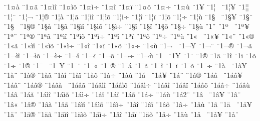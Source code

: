 {^^a81^^a4^^e0
^^a81^^a4^^e3
^^a81^^a4^^ec^^ee
^^a81^^a4^^ec^^f5
^^a81^^a4^^ec^^f7
^^a81^^a4^^ee
^^a81^^a4^^ef
^^a81^^a4^^f5
^^a81^^a4^^f7
^^a81^^a4^^f9
^^a81^^a5
^^a81^^a6^^a0
^^a81^^a6^^a5
^^a81^^a6^^a6
^^a81^^a6^^a8
^^a81^^a6^^ac
^^a81^^a6^^ae
^^a81^^a6^^e0
^^a81^^a6^^e3
^^a81^^a6^^ec^^ee
^^a81^^a6^^ec^^f5
^^a81^^a6^^ec^^f7
^^a81^^a6^^ee
^^a81^^a6^^ef
^^a81^^a6^^f5
^^a81^^a6^^f7
^^a81^^a6^^f9
^^a81^^a7^^a0
^^a81^^a7^^a5
^^a81^^a7^^a8
^^a81^^a7^^ad^^a0
^^a81^^a7^^ae
^^a81^^a7^^e0
^^a81^^a7^^e3
^^a81^^a7^^ec^^ee
^^a81^^a7^^ec^^f5
^^a81^^a7^^ec^^f7
^^a81^^a7^^ee
^^a81^^a7^^ef
^^a81^^a7^^f5
^^a81^^a7^^f7
^^a81^^a7^^f9
^^a81^^a8
^^a81^^aa^^a0
^^a81^^aa^^a5
^^a81^^aa^^a8
^^a81^^aa^^ae
^^a81^^aa^^e3
^^a81^^aa^^ec^^ee
^^a81^^aa^^ec^^f5
^^a81^^aa^^ec^^f7
^^a81^^aa^^ee
^^a81^^aa^^ef
^^a81^^aa^^f5
^^a81^^aa^^f7
^^a81^^aa^^f9
^^a81^^ab^^a0
^^a81^^ab^^a5
^^a81^^ab^^a8
^^a81^^ab^^ae
^^a81^^ab^^e3
^^a81^^ab^^ec^^ee
^^a81^^ab^^ec^^f5
^^a81^^ab^^ec^^f7
^^a81^^ab^^ee
^^a81^^ab^^ef
^^a81^^ab^^f5
^^a81^^ab^^f7
^^a81^^ab^^f9
^^a81^^ac^^a0
^^a81^^ac^^a5
^^a81^^ac^^a8
^^a81^^ac^^ae
^^a81^^ac^^e3
^^a81^^ac^^ec^^ee
^^a81^^ac^^ec^^f5
^^a81^^ac^^ec^^f7
^^a81^^ac^^ee
^^a81^^ac^^ef
^^a81^^ac^^f5
^^a81^^ac^^f7
^^a81^^ac^^f9
^^a81^^ad^^a0
^^a81^^ad^^a5
^^a81^^ad^^a8
^^a81^^ad^^ae
^^a81^^ad^^e3
^^a81^^ad^^ee
^^a81^^ad^^ef
^^a81^^ad^^f5
^^a81^^ad^^f7
^^a81^^ae
^^a81^^af^^a0
^^a81^^af^^a5
^^a81^^af^^a8
^^a81^^af^^ab
^^a81^^af^^ae
^^a81^^af^^e1
^^a81^^af^^e3
^^a81^^af^^ee
^^a81^^af^^ef
^^a81^^af^^f5
^^a81^^af^^f7
^^a81^^e0^^a0
^^a81^^e0^^a5
^^a81^^e0^^a8
^^a81^^e0^^ae
^^a81^^e0^^e3
^^a81^^e0^^ee
^^a81^^e0^^ef
^^a81^^e0^^f5
^^a81^^e0^^f7
^^a81^^e0^^f9
^^a81^^e1^^a0
^^a81^^e1^^a5
^^a81^^e1^^a8
^^a81^^e1^^ae
^^a81^^e1^^e2^^a0
^^a81^^e1^^e2^^a5
^^a81^^e1^^e2^^a8
^^a81^^e1^^e2^^ae
^^a81^^e1^^e2^^e0^^a0
^^a81^^e1^^e2^^e3
^^a81^^e1^^e2^^ec^^ee
^^a81^^e1^^e2^^ec^^f5
^^a81^^e1^^e2^^ec^^f7
^^a81^^e1^^e2^^ee
^^a81^^e1^^e2^^ef
^^a81^^e1^^e2^^f5
^^a81^^e1^^e2^^f7
^^a81^^e1^^e2^^f9
^^a81^^e1^^e2
^^a81^^e1^^e3
^^a81^^e1^^ec^^ee
^^a81^^e1^^ec^^f5
^^a81^^e1^^ec^^f7
^^a81^^e1^^ee
^^a81^^e1^^ef
^^a81^^e1^^f5
^^a81^^e1^^f7
^^a81^^e1^^f9
^^a81^^e12^^ad^^a8
^^a81^^e2^^a0
^^a81^^e2^^a5
^^a81^^e2^^a8
^^a81^^e2^^ab
^^a81^^e2^^ae
^^a81^^e2^^e0
^^a81^^e2^^e3
^^a81^^e2^^ec^^ee
^^a81^^e2^^ec^^f5
^^a81^^e2^^ec^^f7
^^a81^^e2^^ee
^^a81^^e2^^ef
^^a81^^e2^^f5
^^a81^^e2^^f7
^^a81^^e2^^f9
^^a81^^e3
^^a81^^e4^^a0
^^a81^^e4^^a5
^^a81^^e4^^a8
^^a81^^e4^^ae
^^a81^^e4^^e3
^^a81^^e4^^ec^^ee
^^a81^^e4^^ec^^f5
^^a81^^e4^^ec^^f7
^^a81^^e4^^ee
^^a81^^e4^^ef
^^a81^^e4^^f5
^^a81^^e4^^f7
^^a81^^e4^^f9
^^a81^^e5^^a0
^^a81^^e5^^a5
^^a81^^e5^^a8
}
